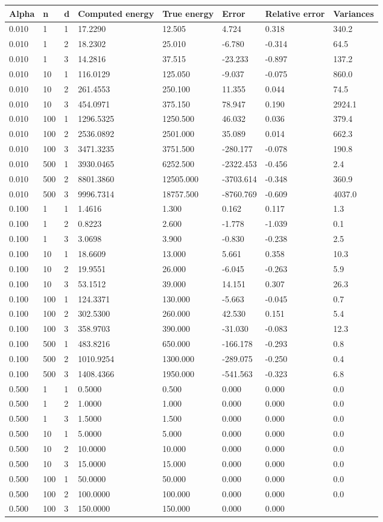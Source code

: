 \documentclass{article}
\begin{document}
\begin{longtable}[]{@{}llllllll@{}}
\toprule
Alpha & n & d & Computed energy & True energy & Error & Relative error &
Variances\tabularnewline
\midrule
\endhead
0.010 & 1 & 1 & 17.2290 & 12.505 & 4.724 & 0.318 & 340.2\tabularnewline
0.010 & 1 & 2 & 18.2302 & 25.010 & -6.780 & -0.314 & 64.5\tabularnewline
0.010 & 1 & 3 & 14.2816 & 37.515 & -23.233 & -0.897 &
137.2\tabularnewline
0.010 & 10 & 1 & 116.0129 & 125.050 & -9.037 & -0.075 &
860.0\tabularnewline
0.010 & 10 & 2 & 261.4553 & 250.100 & 11.355 & 0.044 &
74.5\tabularnewline
0.010 & 10 & 3 & 454.0971 & 375.150 & 78.947 & 0.190 &
2924.1\tabularnewline
0.010 & 100 & 1 & 1296.5325 & 1250.500 & 46.032 & 0.036 &
379.4\tabularnewline
0.010 & 100 & 2 & 2536.0892 & 2501.000 & 35.089 & 0.014 &
662.3\tabularnewline
0.010 & 100 & 3 & 3471.3235 & 3751.500 & -280.177 & -0.078 &
190.8\tabularnewline
0.010 & 500 & 1 & 3930.0465 & 6252.500 & -2322.453 & -0.456 &
2.4\tabularnewline
0.010 & 500 & 2 & 8801.3860 & 12505.000 & -3703.614 & -0.348 &
360.9\tabularnewline
0.010 & 500 & 3 & 9996.7314 & 18757.500 & -8760.769 & -0.609 &
4037.0\tabularnewline
0.100 & 1 & 1 & 1.4616 & 1.300 & 0.162 & 0.117 & 1.3\tabularnewline
0.100 & 1 & 2 & 0.8223 & 2.600 & -1.778 & -1.039 & 0.1\tabularnewline
0.100 & 1 & 3 & 3.0698 & 3.900 & -0.830 & -0.238 & 2.5\tabularnewline
0.100 & 10 & 1 & 18.6609 & 13.000 & 5.661 & 0.358 & 10.3\tabularnewline
0.100 & 10 & 2 & 19.9551 & 26.000 & -6.045 & -0.263 & 5.9\tabularnewline
0.100 & 10 & 3 & 53.1512 & 39.000 & 14.151 & 0.307 & 26.3\tabularnewline
0.100 & 100 & 1 & 124.3371 & 130.000 & -5.663 & -0.045 &
0.7\tabularnewline
0.100 & 100 & 2 & 302.5300 & 260.000 & 42.530 & 0.151 &
5.4\tabularnewline
0.100 & 100 & 3 & 358.9703 & 390.000 & -31.030 & -0.083 &
12.3\tabularnewline
0.100 & 500 & 1 & 483.8216 & 650.000 & -166.178 & -0.293 &
0.8\tabularnewline
0.100 & 500 & 2 & 1010.9254 & 1300.000 & -289.075 & -0.250 &
0.4\tabularnewline
0.100 & 500 & 3 & 1408.4366 & 1950.000 & -541.563 & -0.323 &
6.8\tabularnewline
0.500 & 1 & 1 & 0.5000 & 0.500 & 0.000 & 0.000 & 0.0\tabularnewline
0.500 & 1 & 2 & 1.0000 & 1.000 & 0.000 & 0.000 & 0.0\tabularnewline
0.500 & 1 & 3 & 1.5000 & 1.500 & 0.000 & 0.000 & 0.0\tabularnewline
0.500 & 10 & 1 & 5.0000 & 5.000 & 0.000 & 0.000 & 0.0\tabularnewline
0.500 & 10 & 2 & 10.0000 & 10.000 & 0.000 & 0.000 & 0.0\tabularnewline
0.500 & 10 & 3 & 15.0000 & 15.000 & 0.000 & 0.000 & 0.0\tabularnewline
0.500 & 100 & 1 & 50.0000 & 50.000 & 0.000 & 0.000 & 0.0\tabularnewline
0.500 & 100 & 2 & 100.0000 & 100.000 & 0.000 & 0.000 &
0.0\tabularnewline
0.500 & 100 & 3 & 150.0000 & 150.000 & 0.000 & 0.000 &

\end{longtable}
\end{document}
